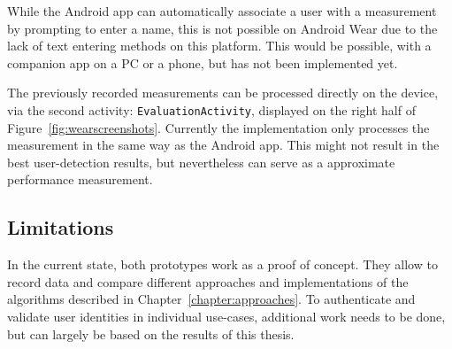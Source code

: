 While the Android \gls{app} can automatically associate a user with a measurement by prompting to enter a name, this is not possible on Android Wear due to the lack of text entering methods on this platform. This would be possible, \eg with a companion \gls{app} on a PC or a phone, but has not been implemented yet.

The previously recorded measurements can be processed directly on the device, via the second \gls{activity}: \lstinline$EvaluationActivity$, displayed on the right half of Figure~\ref{fig:wearscreenshots}. Currently the implementation only processes the measurement in the same way as the Android \gls{app}. This might not result in the best user-detection results, but nevertheless can serve as a approximate performance measurement.

\subsection{Limitations}
In the current state, both prototypes work as a proof of concept. They allow to record data and compare different approaches and implementations of the algorithms described in Chapter~\ref{chapter:approaches}. To authenticate and validate user identities in individual use-cases, additional work needs to be done, but can largely be based on the results of this thesis.
